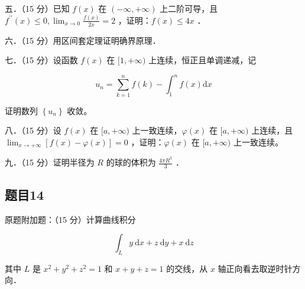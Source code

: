 \documentclass{article}
\begin{document}
五．（15 分）已知 \(f(x)\) 在 \((-\infty,+\infty)\) 上二阶可导，且 \(f^{\prime \prime}(x) \leq 0, \lim _{x \rightarrow 0} \frac{f(x)}{2 x}=2\) ，证明：\(f(x) \leq 4 x\) ．

六．（15 分）用区间套定理证明确界原理．

七．（15 分）设函数 \(f(x)\) 在 \([1,+\infty)\) 上连续，恒正且单调递减，记

\[
u_{n}=\sum_{k=1}^{n} f(k)-\int_{1}^{n} f(x) \mathrm{d} x
\]

证明数列 \(\left\{u_{n}\right\}\) 收敛。

八．（15 分）设 \(f(x)\) 在 \([a,+\infty)\) 上一致连续，\(\varphi(x)\) 在 \([a,+\infty)\) 上连续，且 \(\lim _{x \rightarrow+\infty}[f(x)-\varphi(x)]=0\) ，证明：\(\varphi(x)\) 在 \([a,+\infty)\) 上一致连续。

九．（15 分）证明半径为 \(R\) 的球的体积为 \(\frac{4 \pi R^{3}}{3}\) ．

\subsection{题目14}
原题附加题：（15 分）计算曲线积分

\[
\int_{L} y \mathrm{~d} x+z \mathrm{~d} y+x \mathrm{~d} z
\]

其中 \(L\) 是 \(x^{2}+y^{2}+z^{2}=1\) 和 \(x+y+z=1\) 的交线，从 \(x\) 轴正向看去取逆时针方向．
\end{document}
